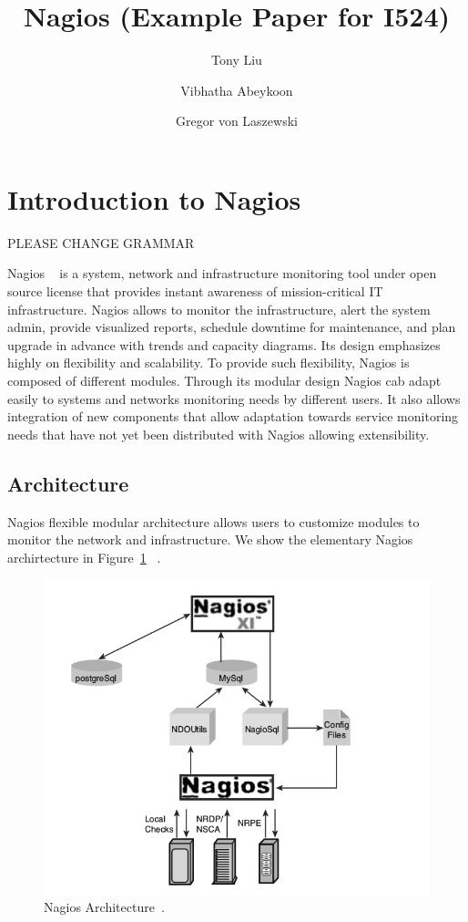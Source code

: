 \documentclass[9pt,twocolumn,twoside]{styles/osajnl}
\title{\centering%
Nagios (Example Paper for I524)}
\author[1]{Tony Liu}
\author[1]{Vibhatha Abeykoon}
\author[1]{Gregor von Laszewski}
\affil[1]{School of Informatics and Computing, Bloomington, IN 47408, U.S.A.}
\begin{document}
\maketitle

\section{Introduction to Nagios}

PLEASE CHANGE GRAMMAR

Nagios ~\cite{www-nagios, wiki-nagios} is a system, network and
infrastructure monitoring tool under open source license that provides
instant awareness of mission-critical IT infrastructure. Nagios allows
to monitor the infrastructure, alert the system admin, provide
visualized reports, schedule downtime for maintenance, and plan
upgrade in advance with trends and capacity diagrams. Its design
emphasizes highly on flexibility and scalability. To provide such
flexibility, Nagios is composed of different modules. Through its
modular design Nagios cab adapt easily to systems and networks
monitoring needs by different users. It also allows integration of new
components that allow adaptation towards service monitoring needs that
have not yet been distributed with Nagios allowing extensibility.

\subsection{Architecture}

Nagios \cite{nagios-paper-2012} flexible modular architecture allows
users to customize modules to monitor the network and
infrastructure. We show the elementary Nagios archirtecture in
Figure~\ref{fig:Nagios-architecture} ~\cite{nagios-book}.

\begin{figure}[htb]
\centering
\includegraphics[width=\columnwidth]{images/nagios-architecture}
\caption{Nagios Architecture~\cite{nagios-book}.}
\label{fig:Nagios-architecture}
\end{figure}
\end{document}
